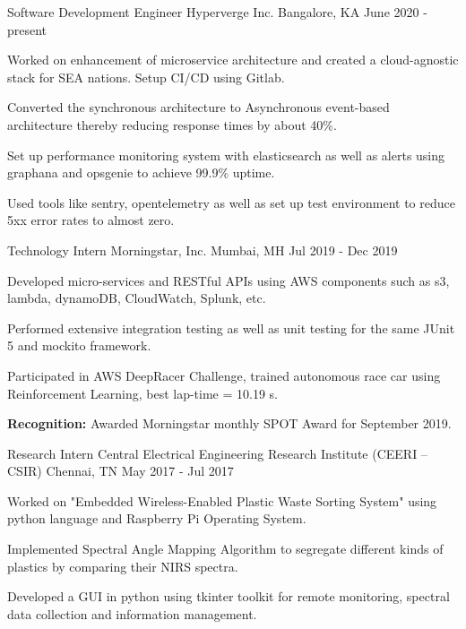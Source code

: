 \begin{cventries}
  \cventry
  {Software Development Engineer}
  {Hyperverge Inc.}
  {Bangalore, KA}
  {June 2020 - present}
  {
    \begin{cvitems}
      \item {Worked on enhancement of microservice architecture and created a cloud-agnostic stack for SEA nations. Setup CI/CD using Gitlab.}
      \item {Converted the synchronous architecture to Asynchronous event-based architecture thereby reducing response times by about 40\%.}    
      \item {Set up performance monitoring system with elasticsearch as well as alerts using graphana and opsgenie to achieve 99.9\% uptime.}
      \item {Used tools like sentry, opentelemetry as well as set up test environment to reduce 5xx error rates to almost zero.}
    \end{cvitems}
  }
  \cventry
    {Technology Intern}
    {Morningstar, Inc.}
    {Mumbai, MH}
    {Jul 2019 - Dec 2019}
    {
      \begin{cvitems}
        \item {Developed micro-services and RESTful APIs using AWS components such as s3, lambda, dynamoDB, CloudWatch, Splunk, etc.}
        \item {Performed extensive integration testing as well as unit testing for the same JUnit 5 and mockito framework.}
        \item {Participated in AWS DeepRacer Challenge, trained autonomous race car using Reinforcement Learning, best lap-time = 10.19 s.}
        \item {\textbf{Recognition:} Awarded Morningstar monthly SPOT Award for September 2019.}
      \end{cvitems}
    }
  \cventry
    {Research Intern}
    {Central Electrical Engineering Research Institute (CEERI – CSIR)}
    {Chennai, TN}
    {May 2017 - Jul 2017}
    {
      \begin{cvitems}
        \item {Worked on "Embedded Wireless-Enabled Plastic Waste Sorting System" using python language and Raspberry Pi Operating System.}
        \item {Implemented Spectral Angle Mapping Algorithm to segregate different kinds of plastics by comparing their NIRS spectra.}
        \item {Developed a GUI in python using tkinter toolkit for remote monitoring, spectral data collection and information management.}
      \end{cvitems}
    }

\end{cventries}
